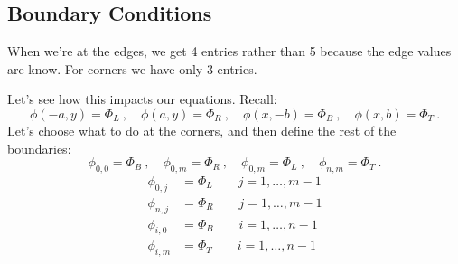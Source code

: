 \documentclass[12pt]{article}
\begin{document}
\subsection{Boundary Conditions}

When we're at the edges, we get 4 entries rather than 5 because the edge values are know. For corners we have only 3 entries. 

Let's see how this impacts our equations. Recall:
%
\[\phi(-a,y) = \Phi_L\:, \quad \phi(a,y) = \Phi_R\:, \quad \phi(x,-b) = \Phi_B\:, \quad \phi(x,b) = \Phi_T\:.\]
%
Let's choose what to do at the corners, and then define the rest of the boundaries:
\[\phi_{0,0} = \Phi_B\:, \quad \phi_{0,m} = \Phi_R\:, \quad \phi_{0,m} = \Phi_L\:, \quad \phi_{n,m} = \Phi_T\:.\]
%
\begin{align}
\phi_{0,j} &= \Phi_L \qquad j=1,\dots,m-1 \nonumber \\
\phi_{n,j} &= \Phi_R \qquad j=1,\dots,m-1 \nonumber \\
\phi_{i,0} &= \Phi_B \qquad i=1,\dots,n-1 \nonumber \\
\phi_{i,m} &= \Phi_T \qquad i=1,\dots,n-1 \nonumber 
\end{align}
\end{document}

